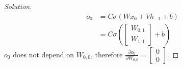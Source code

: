 \documentclass{article}
\begin{document}
\begin{proof}[Solution]
    \begin{align*}
        o_0 & = C \sigma \left( Wx_0 + Vh_{-1} + b \right) \\
        & = C \sigma \left( \begin{bmatrix} W_{0,1} \\ W_{1,1} \end{bmatrix} + b \right)
    \end{align*}
    $o_0$ does not depend on $W_{0,0}$, therefore $\frac{\partial o_0}{\partial W_{0,0}} = \begin{bmatrix} 0 \\ 0 \end{bmatrix}$.
\end{proof}
\end{document}
